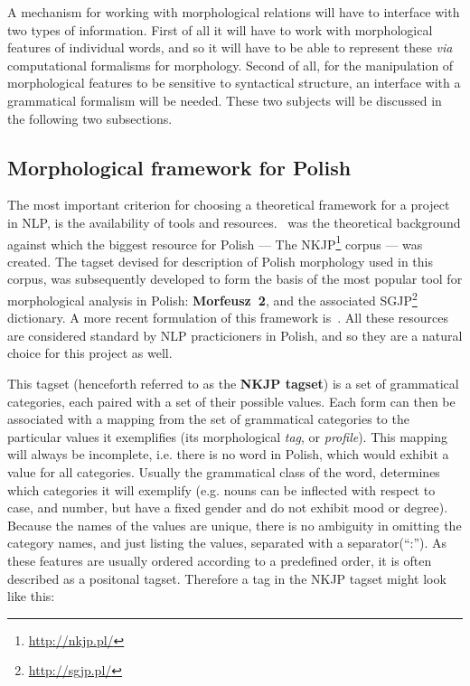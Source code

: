 \documentclass[12pt]{article}
\begin{document}
A mechanism for working with morphological relations will have to interface with two types of information. First of all it will have to work with morphological features of individual words, and so it will have to be able to represent these \textit{via} computational formalisms for morphology. Second of all, for the manipulation of morphological features to be sensitive to syntactical structure, an interface with a grammatical formalism will be needed. These two subjects will be discussed in the following two subsections.

\subsection{Morphological framework for Polish}
The most important criterion for choosing a theoretical framework for a project in NLP, is the availability of tools and resources.~\cite{saloni:2012} was the theoretical background against which the biggest resource for Polish --- The NKJP\cite{prz:etal:11:ed}\footnote{\url{http://nkjp.pl/}} corpus --- was created. The tagset devised for description of Polish morphology used in this corpus, was subsequently developed to form the basis of the most popular tool for morphological analysis in Polish: \textbf{Morfeusz~2}\cite{kieras:2017}, and the associated SGJP\footnote{\url{http://sgjp.pl/}} dictionary. A more recent formulation of this framework is~\cite{wolinski:2019}. All these resources are considered standard by NLP practicioners in Polish, and so they are a natural choice for this project as well.

This tagset (henceforth referred to as the \textbf{NKJP tagset}) is a set of grammatical categories, each paired with a set of their possible values. Each form can then be associated with a mapping from the set of grammatical categories to the particular values it exemplifies (its morphological \textit{tag}, or \textit{profile}). This mapping will always be incomplete, i.e. there is no word in Polish, which would exhibit a value for all categories. Usually the grammatical class of the word, determines which categories it will exemplify (e.g. nouns can be inflected with respect to case, and number, but have a fixed gender and do not exhibit mood or degree). Because the names of the values are unique, there is no ambiguity in omitting the category names, and just listing the values, separated with a separator(``:''). As these features are usually ordered according to a predefined order, it is often described as a positonal tagset. Therefore a tag in the NKJP tagset might look like this:
\end{document}
